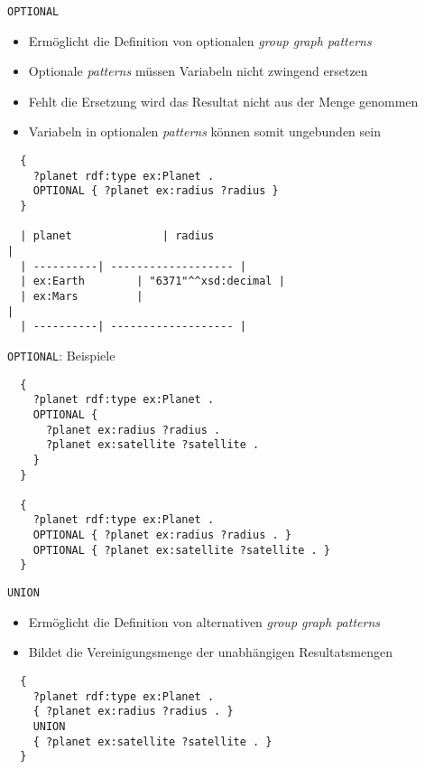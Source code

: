 \documentclass{beamer}
\begin{document}
\begin{frame}[fragile]{\texttt{OPTIONAL}}
	
	\begin{itemize}
		\item Ermöglicht die Definition von optionalen \emph{group graph patterns}
		\item Optionale \emph{patterns} müssen Variabeln nicht zwingend ersetzen
		\item Fehlt die Ersetzung wird das Resultat nicht aus der Menge genommen
		\item Variabeln in optionalen \emph{patterns} können somit ungebunden sein
	\end{itemize}
	
	\small
	\begin{lstlisting}
  {
    ?planet rdf:type ex:Planet .
    OPTIONAL { ?planet ex:radius ?radius }
  }
  
  | planet				| radius														|
  | ----------| ------------------- |
  | ex:Earth		| "6371"^^xsd:decimal |
  | ex:Mars			|																					|
  | ----------| ------------------- |
	\end{lstlisting}
	
\end{frame}

\begin{frame}[fragile]{\texttt{OPTIONAL}: Beispiele}
	
	\small
	\begin{lstlisting}
  {
    ?planet rdf:type ex:Planet .
    OPTIONAL { 
      ?planet ex:radius ?radius .
      ?planet ex:satellite ?satellite .
    }
  }
  
  {
    ?planet rdf:type ex:Planet .
    OPTIONAL { ?planet ex:radius ?radius . }
    OPTIONAL { ?planet ex:satellite ?satellite . }
  }
	\end{lstlisting}
	
\end{frame}

\begin{frame}[fragile]{\texttt{UNION}}
	
	\begin{itemize}
		\item Ermöglicht die Definition von alternativen \emph{group graph patterns}
		\item Bildet die Vereinigungsmenge der unabhängigen Resultatsmengen
	\end{itemize}
	
	\small
	\begin{lstlisting}
  {
    ?planet rdf:type ex:Planet .
    { ?planet ex:radius ?radius . }
    UNION
    { ?planet ex:satellite ?satellite . }	
  }
	\end{lstlisting}
	
\end{frame}
\end{document}
